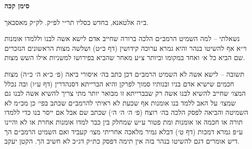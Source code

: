 \documentclass[12pt, openany]{book}
\newcommand{\chapname}{}
\newcommand{\newchap}[1]{
	\addcontentsline{toc}{chapter}{#1}
	\renewcommand{\chapname}{#1}
		\begin{center}
			\textbf{%
\fontsize{16pt}{16pt}\selectfont
				#1}
		\end{center}
}
\begin{document}
\newchap{סימן קכה}
\begin{multicols}{2}
ב״ה אלטאנא, בחדש כסליו תר״י לפ״ק. לק״ק מאסבאך.\\\vspace{0pt}

נשאלתי – למה השמיט הרמב״ם הלכה ברורה שחייב אדם לישא אשה לבנו וללמדו אומנות וי״א אף להשיטו בנהר והיא גמרא ערוכה קידושין (דף כ״ט) ושלשה מצות הראשונים הנזכרים שם הביא כל א׳ ואחד במקומו וביותר צ״ע מאחר שהביא בפירושו למשניות אילו השש מצות.\\\vspace{0pt}

תשובה – לישא אשה לא השמיט הרמב״ם דכן כתב בה׳ איסורי ביאה (פ׳ כ״א ה׳ כ״ה) מצות חכמים שישיא אדם בניו ובנותיו סמוך לפרקן והיא הברייתא דסנהדרין (דף ע״ו) ובה נכלל המצו׳ שחייב להשיא לבנו אשה רק שבברייתא זו מבואר יותר מתי צריך להשיא אשה לבנו גם שמצו׳ על האב ללמד בנו אומנות אף שכעת לא ראיתי להרמב״ם שכתב בפי׳ כן מכ״מ לא השמיטה והביאה לפסק הלכה בה׳ רוצח (פ׳ ה׳ ה׳ ה׳) שכתב שם אבל אם ייסר בנו כדי ללמדו תורה או חכמה או אומנות ומת פטור ע״ש שמחלק בין כבר למדו אומנות אחרת או לא והיינו ע״פ גמרא דמכות (דף ט׳) דבלא גמיר מלאכה אחריתי מצו׳ קעביד ואם השמיט הרמב״ם הך דיש אומרים דגם להשיטו בנהר בזה אין תימה דפסק כת״ק דג״כ לא חשיב הך. הקטן יעקב.\\\vspace{0pt}

\end{multicols}\newpage
\end{document}
